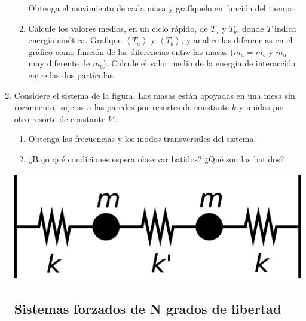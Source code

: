 \documentclass[11pt,spanish,a4paper]{article}
\begin{document}
\begin{enumerate}
\begin{enumerate}
Obtenga el movimiento de cada masa y grafíquelo en función del tiempo.
	\item Calcule los valores medios, en un ciclo rápido, de $T_{a}$ y $T_{b}$, donde $T$ indica energía cinética. Grafique $\left\langle T_{a}\right\rangle $ y $\left\langle T_{b}\right\rangle $, y analice las diferencias en el gráfico como función de las diferencias entre las masas ($m_{a}=m_{b}$ y $m_{a}$ muy diferente de $m_{b}$).
Calcule el valor medio de la energía de interacción entre las dos partículas.
\end{enumerate}



\item \label{2masitas}
\begin{minipage}[t][2.8cm]{0.7\textwidth}
Considere el sistema de la figura. Las masas están apoyadas en una mesa sin rozamiento, sujetas a las paredes por resortes de constante
$k$ y unidas por otro resorte de constante $k'$.
\begin{enumerate}
	\item Obtenga las frecuencias y los modos transversales del sistema. 
	\item ¿Bajo qué condiciones espera observar batidos?
	¿Qué son los batidos?
\end{enumerate}
\end{minipage}
\begin{minipage}[c][0cm][t]{0.25\textwidth}
  \includegraphics[width=\textwidth]{ej1-8}
\end{minipage}

								
\subsection*{Sistemas forzados de N grados de libertad}



\end{enumerate}
\end{document}
